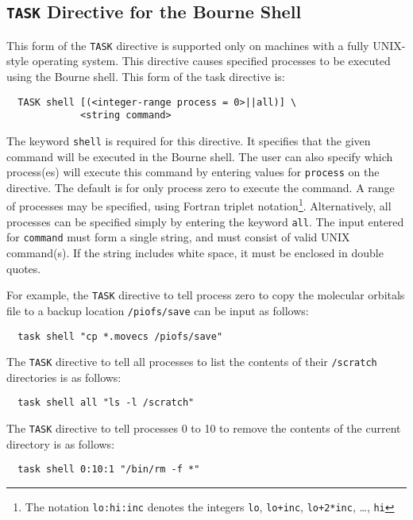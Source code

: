 \subsection{{\tt TASK} Directive for the Bourne Shell}

This form of the \verb+TASK+ directive is supported only on machines
with a fully UNIX-style operating system.  This directive causes
specified processes to be executed using the Bourne shell.  This form
of the task directive is:

\begin{verbatim}
  TASK shell [(<integer-range process = 0>||all)] \
             <string command> 
\end{verbatim}

The keyword \verb+shell+ is required for this directive.  It specifies
that the given command will be executed in the Bourne shell.  The user
can also specify which process(es) will execute this command by
entering values for \verb+process+ on the directive.  The default is
for only process zero to execute the command.  A range of processes
may be specified, using Fortran triplet notation\footnote{The notation
{\tt lo:hi:inc} denotes the integers {\tt lo}, {\tt lo+inc},
{\tt lo+2*inc}, \ldots, {\tt hi}}.  Alternatively, all
processes can be specified simply by entering the keyword \verb+all+.
The input entered for \verb+command+ must form a single string, and
must consist of valid UNIX command(s).  If the string includes white space,
it must be enclosed in double quotes.

For example, the \verb+TASK+ directive to tell process zero to copy the 
molecular orbitals file to a backup location \verb+/piofs/save+ can be input as follows:

\begin{verbatim}
  task shell "cp *.movecs /piofs/save"
\end{verbatim}

The \verb+TASK+ directive to tell all processes to list the contents of 
their \verb+/scratch+ directories is as follows:

\begin{verbatim}
  task shell all "ls -l /scratch"
\end{verbatim}

The \verb+TASK+ directive to tell processes 0 to 10 to remove the 
contents of the current directory is as follows:

\begin{verbatim}
  task shell 0:10:1 "/bin/rm -f *"
\end{verbatim}

